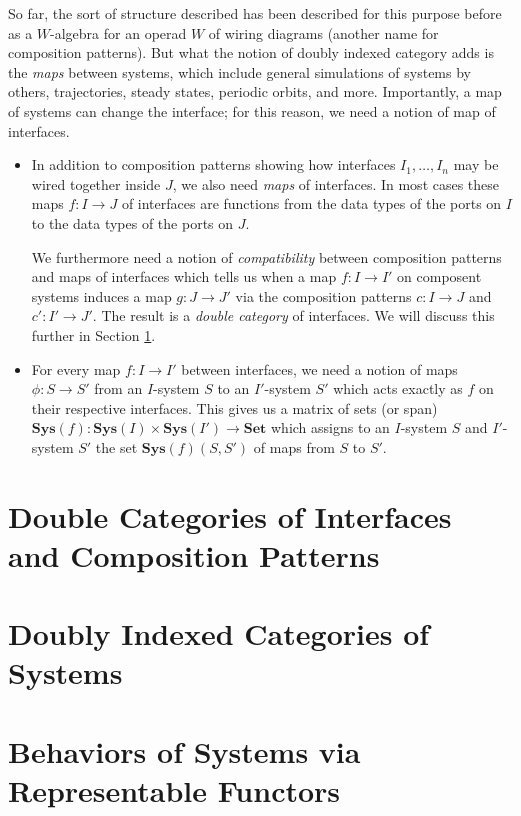 \documentclass{article}
\begin{document}
So far, the sort of structure described has been described for this purpose
before as a $W$-algebra for an operad $W$ of wiring diagrams (another name for
composition patterns). But what the notion of doubly indexed category adds is
the \emph{maps} between systems, which include general simulations of systems by
others, trajectories, steady states, periodic orbits, and more. Importantly, a
map of systems can change the interface; for this reason, we need a notion of
map of interfaces.
\begin{itemize}
  \item In addition to composition patterns showing how interfaces $I_1,\ldots,
    I_n$ may be wired together inside $J$, we also need \emph{maps} of
    interfaces. In most cases these maps $f : I \to J$ of interfaces are functions from the
    data types of the ports on $I$ to the data types of the ports on $J$. 

    We furthermore need a notion of \emph{compatibility} between composition
    patterns and maps of interfaces which tells us when a map $f : I \to I'$ on
    composent systems induces a map $g : J \to J'$ via the composition patterns
    $c : I \to J$ and $c' : I' \to J'$. The result is a \emph{double category}
    of interfaces. We
    will discuss this further in Section
    \ref{sec.interfaces}.
  \item For every map $f : I \to I'$ between interfaces, we need a
    notion of maps $\phi : S \to S'$ from an $I$-system $S$ to an $I'$-system
    $S'$ which acts exactly as $f$ on their respective interfaces. This gives us
    a matrix of sets (or span) $\textbf{Sys}(f) :
    \textbf{Sys}(I) \times \textbf{Sys}(I') \to \textbf{Set}$ which
    assigns to an $I$-system $S$ and $I'$-system $S'$ the set
    $\textbf{Sys}(f)(S, S')$ of maps from $S$ to $S'$. 
\end{itemize}

\section{Double Categories of Interfaces and Composition Patterns} \label{sec.interfaces}



\section{Doubly Indexed Categories of Systems}


\section{Behaviors of Systems via Representable Functors}



\end{document}
